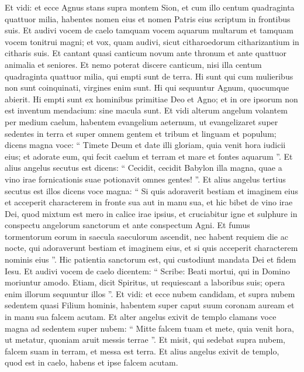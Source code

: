 \begin{biblechapter}
\begin{biblechapter}
\begin{biblechapter}
\begin{biblechapter}
\begin{biblechapter}
\begin{biblechapter}
\begin{biblechapter}
\begin{biblechapter}
\begin{biblechapter}
\begin{biblechapter}
\begin{biblechapter}
\begin{biblechapter}
\begin{biblechapter}
\begin{biblechapter}
\verse Et vidi: et ecce Agnus stans supra montem Sion, et cum illo centum quadraginta quattuor milia, habentes nomen eius et nomen Patris eius scriptum in frontibus suis. 
\verse Et audivi vocem de caelo tamquam vocem aquarum multarum et tamquam vocem tonitrui magni; et vox, quam audivi, sicut citharoedorum citharizantium in citharis suis. 
\verse Et cantant quasi canticum novum ante thronum et ante quattuor animalia et seniores. Et nemo poterat discere canticum, nisi illa centum quadraginta quattuor milia, qui empti sunt de terra. 
\verse Hi sunt qui cum mulieribus non sunt coinquinati, virgines enim sunt. Hi qui sequuntur Agnum, quocumque abierit. Hi empti sunt ex hominibus primitiae Deo et Agno; 
\verse et in ore ipsorum non est inventum mendacium: sine macula sunt.
 \verse Et vidi alterum angelum volantem per medium caelum, habentem evangelium aeternum, ut evangelizaret super sedentes in terra et super omnem gentem et tribum et linguam et populum; 
\verse dicens magna voce: “ Timete Deum et date illi gloriam, quia venit hora iudicii eius; et adorate eum, qui fecit caelum et terram et mare et fontes aquarum ”.
 \verse Et alius angelus secutus est dicens: “ Cecidit, cecidit Babylon illa magna, quae a vino irae fornicationis suae potionavit omnes gentes! ”.
 \verse Et alius angelus tertius secutus est illos dicens voce magna: “ Si quis adoraverit bestiam et imaginem eius et acceperit characterem in fronte sua aut in manu sua, 
\verse et hic bibet de vino irae Dei, quod mixtum est mero in calice irae ipsius, et cruciabitur igne et sulphure in conspectu angelorum sanctorum et ante conspectum Agni. 
\verse Et fumus tormentorum eorum in saecula saeculorum ascendit, nec habent requiem die ac nocte, qui adoraverunt bestiam et imaginem eius, et si quis acceperit characterem nominis eius ”.
 \verse Hic patientia sanctorum est, qui custodiunt mandata Dei et fidem Iesu. 
\verse Et audivi vocem de caelo dicentem: “ Scribe: Beati mortui, qui in Domino moriuntur amodo. Etiam, dicit Spiritus, ut requiescant a laboribus suis; opera enim illorum sequuntur illos ”. 
\verse Et vidi: et ecce nubem candidam, et supra nubem sedentem quasi Filium hominis, habentem super caput suum coronam auream et in manu sua falcem acutam. 
\verse Et alter angelus exivit de templo clamans voce magna ad sedentem super nubem: “ Mitte falcem tuam et mete, quia venit hora, ut metatur, quoniam aruit messis terrae ”. 
\verse Et misit, qui sedebat supra nubem, falcem suam in terram, et messa est terra.
 \verse Et alius angelus exivit de templo, quod est in caelo, habens et ipse falcem acutam. 

\end{biblechapter}
\end{biblechapter}
\end{biblechapter}
\end{biblechapter}
\end{biblechapter}
\end{biblechapter}
\end{biblechapter}
\end{biblechapter}
\end{biblechapter}
\end{biblechapter}
\end{biblechapter}
\end{biblechapter}
\end{biblechapter}
\end{biblechapter}
